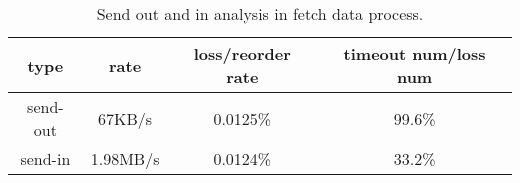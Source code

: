 \begin{table}[ht]
\tablefontsize
\renewcommand{\arraystretch}{\assize}
 \setlength{\tabcolsep}{3pt}
\caption{Send out and in analysis in fetch data process.}
\centering
\begin{tabular}{c|c|c|c}
	\toprule
	 type & rate & loss/reorder rate & timeout num/loss num \\
	\hline
	send-out & 67KB/s & 0.0125\% & 99.6\% \\
	\hline
	send-in & 1.98MB/s & 0.0124\% & 33.2\% \\
	\bottomrule
\end{tabular}
\label{tbl:fetch-data}
\termspace
\end{table} 